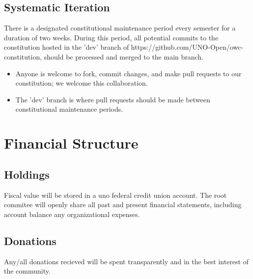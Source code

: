 \documentclass{article}
\newcommand{\article}[1]{\section{#1} \label{#1}}
\newcommand{\asection}[1]{\subsection{#1} \label{#1}}
\newcommand{\asubsection}[1]{\subsubsection{#1} \label{#1}}
\begin{document}
\asection{Systematic Iteration}
There is a designated constitutional maintenance period every semester for a duration of two weeks. During this period, all potential commits to the constitution hosted in the 'dev' branch of https://github.com/UNO-Open/owc-constitution, should be processed and merged to the main branch.
\begin{itemize}
    \item Anyone is welcome to fork, commit changes, and make pull requests to our constitution; we welcome this collaboration.
    \item The 'dev' branch is where pull requests should be made between constitutional maintenance periods.
\end{itemize}






\article{Financial Structure}
\asection{Holdings}
Fiscal value will be stored in a uno federal credit union account. The root commitee will openly share all past and present financial statements, including account balance any organizational expenses. %
\asection{Donations}
Any/all donations recieved will be spent transparently and in the best interest of the community.
\end{document}

